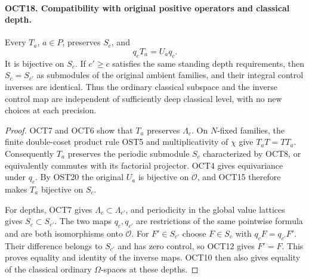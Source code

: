 \paragraph{OCT18. Compatibility with original positive operators and classical depth.}
\label{claim:OCT18}
Every $T_a$, $a\in P$, preserves $S_c$, and
\[
                  q_cT_a=U_aq_c.
\]
It is bijective on $S_c$.  If $c'\geq c$ satisfies the same
standing depth requirements, then $S_c=S_{c'}$ as submodules
of the original ambient families, and their integral control
inverses are identical.  Thus the ordinary classical subspace
and the inverse control map are independent of sufficiently
deep classical level, with no new choices at each precision.
\begin{proof}
OCT7 and OCT6 show that $T_a$ preserves $\Lambda_c$.
On $N$-fixed families, the finite double-coset product rule
OST5 and multiplicativity of $\chi$ give
$T_aT=T T_a$.  Consequently $T_a$ preserves the periodic
submodule $S_c$ characterized by OCT8, or equivalently
commutes with its factorial projector.  OCT4 gives
equivariance under $q_c$.  By OST20 the original $U_a$ is
bijective on $\mathcal O$, and OCT15 therefore makes $T_a$
bijective on $S_c$.

For depths, OCT7 gives $\Lambda_c\subset\Lambda_{c'}$,
and periodicity in the global value lattices gives
$S_c\subset S_{c'}$.  The two maps $q_c,q_{c'}$ are
restrictions of the same pointwise formula and are both
isomorphisms onto $\mathcal O$.  For $F'\in S_{c'}$ choose
$F\in S_c$ with $q_cF=q_{c'}F'$.  Their difference belongs
to $S_{c'}$ and has zero control, so OCT12 gives $F'=F$.
This proves equality and identity of the inverse maps.
OCT10 then also gives equality of the classical ordinary
$\Omega$-spaces at these depths.
\end{proof}

